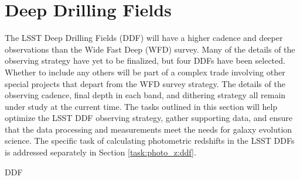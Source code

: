 \section{Deep Drilling Fields}\label{sec:tasks:ddf}  

{\justify
The LSST Deep Drilling Fields (DDF) will have a higher cadence and deeper observations than the Wide Fast Deep (WFD) survey.
Many of the details of the observing strategy have yet to be finalized, but four DDFs have been selected.
Whether to include any others will be part of a complex trade involving other special projects that depart from the WFD survey strategy. The details of the observing cadence, final depth in each band, and dithering strategy all remain  under study at the current time. 
The tasks outlined in this section will help optimize the LSST DDF
observing strategy, gather supporting data, and ensure that the data processing and measurements meet the needs for galaxy evolution science.
The specific task of calculating photometric redshifts in the LSST DDFs is addressed separately in Section \ref{task:photo_z:ddf}.

\begin{tasklist}{DDF}


\end{tasklist}}
